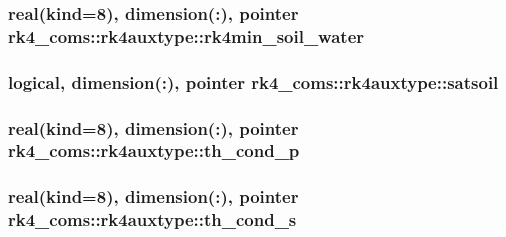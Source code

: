 \subsubsection[{rk4min\+\_\+soil\+\_\+water}]{\setlength{\rightskip}{0pt plus 5cm}real(kind=8), dimension(\+:), pointer rk4\+\_\+coms\+::rk4auxtype\+::rk4min\+\_\+soil\+\_\+water}\label{structrk4__coms_1_1rk4auxtype_a8520b0ab485e69fee8994a4088a2ca00}
\hypertarget{structrk4__coms_1_1rk4auxtype_a54fe72b55c0b02258c500c320ef5f4c4}{}
\subsubsection[{satsoil}]{\setlength{\rightskip}{0pt plus 5cm}logical, dimension(\+:), pointer rk4\+\_\+coms\+::rk4auxtype\+::satsoil}\label{structrk4__coms_1_1rk4auxtype_a54fe72b55c0b02258c500c320ef5f4c4}
\hypertarget{structrk4__coms_1_1rk4auxtype_a73dbe8480f8e37618760acc5ec3a2a1a}{}
\subsubsection[{th\+\_\+cond\+\_\+p}]{\setlength{\rightskip}{0pt plus 5cm}real(kind=8), dimension(\+:), pointer rk4\+\_\+coms\+::rk4auxtype\+::th\+\_\+cond\+\_\+p}\label{structrk4__coms_1_1rk4auxtype_a73dbe8480f8e37618760acc5ec3a2a1a}
\hypertarget{structrk4__coms_1_1rk4auxtype_adbe58418107a9f022aa4ec6d3750e019}{}
\subsubsection[{th\+\_\+cond\+\_\+s}]{\setlength{\rightskip}{0pt plus 5cm}real(kind=8), dimension(\+:), pointer rk4\+\_\+coms\+::rk4auxtype\+::th\+\_\+cond\+\_\+s}\label{structrk4__coms_1_1rk4auxtype_adbe58418107a9f022aa4ec6d3750e019}
\hypertarget{structrk4__coms_1_1rk4auxtype_a35a7768804c49946386dc93198567136}{}
